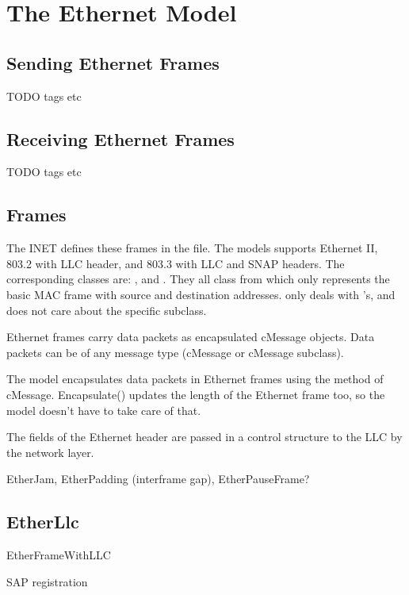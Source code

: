 \chapter{The Ethernet Model}
\label{cha:ethernet}

\section{Sending Ethernet Frames}

TODO tags etc

\section{Receiving Ethernet Frames}

TODO tags etc

\section{Frames}

The INET defines these frames in the  file.
The models supports Ethernet II, 803.2 with LLC header, and 803.3 with LLC and SNAP headers.
The corresponding classes are:
,  and . They all class
from  which only represents the basic MAC frame with source and
destination addresses.  only deals with 's, and does not
care about the specific subclass.

Ethernet frames carry data packets as encapsulated cMessage objects.
Data packets can be of any message type (cMessage or cMessage subclass).

The model encapsulates data packets in Ethernet frames using the 
method of cMessage. Encapsulate() updates the length of the Ethernet frame too,
so the model doesn't have to take care of that.

The fields of the Ethernet header are passed in a 
control structure to the LLC by the network layer.


EtherJam, EtherPadding (interframe gap), EtherPauseFrame?


\section{EtherLlc}

EtherFrameWithLLC

SAP registration


